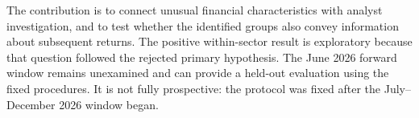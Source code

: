 The contribution is to connect unusual financial characteristics with analyst investigation, and to test whether the identified groups also convey information about subsequent returns. The positive within-sector result is exploratory because that question followed the rejected primary hypothesis. The June 2026 forward window remains unexamined and can provide a held-out evaluation using the fixed procedures. It is not fully prospective: the protocol was fixed after the July--December 2026 window began.
